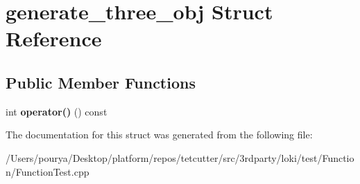 \hypertarget{structgenerate__three__obj}{}\section{generate\+\_\+three\+\_\+obj Struct Reference}
\label{structgenerate__three__obj}
\subsection*{Public Member Functions}
\begin{DoxyCompactItemize}
\item 
\hypertarget{structgenerate__three__obj_a1929b775aa317c0f5cb4d8ebc69b6009}{}int {\bfseries operator()} () const \label{structgenerate__three__obj_a1929b775aa317c0f5cb4d8ebc69b6009}

\end{DoxyCompactItemize}


The documentation for this struct was generated from the following file\+:\begin{DoxyCompactItemize}
\item 
/\+Users/pourya/\+Desktop/platform/repos/tetcutter/src/3rdparty/loki/test/\+Function/Function\+Test.\+cpp\end{DoxyCompactItemize}
